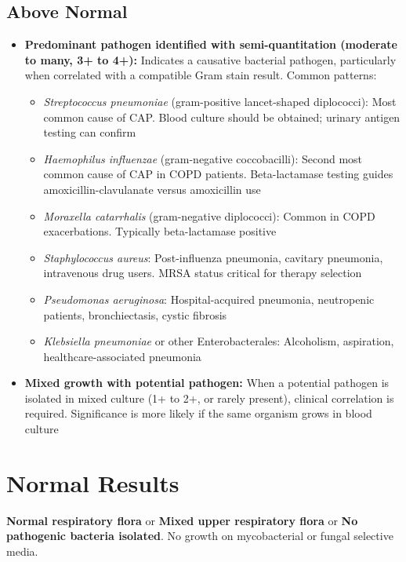 \subsection*{Above Normal}
\begin{itemize}
  \item \textbf{Predominant pathogen identified with semi-quantitation (moderate to many, 3+ to 4+):} Indicates a causative bacterial pathogen, particularly when correlated with a compatible Gram stain result. Common patterns:
    \begin{itemize}
      \item \textit{Streptococcus pneumoniae} (gram-positive lancet-shaped diplococci): Most common cause of CAP. Blood culture should be obtained; urinary antigen testing can confirm
      \item \textit{Haemophilus influenzae} (gram-negative coccobacilli): Second most common cause of CAP in COPD patients. Beta-lactamase testing guides amoxicillin-clavulanate versus amoxicillin use
      \item \textit{Moraxella catarrhalis} (gram-negative diplococci): Common in COPD exacerbations. Typically beta-lactamase positive
      \item \textit{Staphylococcus aureus}: Post-influenza pneumonia, cavitary pneumonia, intravenous drug users. MRSA status critical for therapy selection
      \item \textit{Pseudomonas aeruginosa}: Hospital-acquired pneumonia, neutropenic patients, bronchiectasis, cystic fibrosis
      \item \textit{Klebsiella pneumoniae} or other Enterobacterales: Alcoholism, aspiration, healthcare-associated pneumonia
    \end{itemize}
  \item \textbf{Mixed growth with potential pathogen:} When a potential pathogen is isolated in mixed culture (1+ to 2+, or rarely present), clinical correlation is required. Significance is more likely if the same organism grows in blood culture
\end{itemize}

\section*{Normal Results}
\textbf{Normal respiratory flora} or \textbf{Mixed upper respiratory flora} or \textbf{No pathogenic bacteria isolated}. No growth on mycobacterial or fungal selective media.

